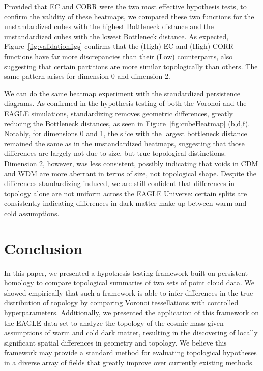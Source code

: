 \documentclass[12pt]{article}
\newcommand{\figref}[1]{Figure~\ref{#1}}
\begin{document}
Provided that EC and CORR were the two most effective hypothesis tests, to confirm the validity of these heatmaps, we compared these two functions for the unstandardized cubes with the highest Bottleneck distance and the unstandardized cubes with the lowest Bottleneck distance. As expected, \figref{fig:validationfigs} confirms that the (High) EC and (High) CORR functions have far more discrepancies than their (Low) counterparts, also suggesting that certain partitions are more similar topologically than others. The same pattern arises for dimension 0 and dimension 2.

We can do the same heatmap experiment with the standardized persistence diagrams. As confirmed in the hypothesis testing of both the Voronoi and the EAGLE simulations, standardizing removes geometric differences, greatly reducing the Bottleneck distances, as seen in \figref{fig:cubeHeatmap} (b,d,f). Notably, for dimensions 0 and 1, the slice with the largest bottleneck distance remained the same as in the unstandardized heatmaps, suggesting that those differences are largely not due to size, but true topological distinctions. Dimension 2, however, was less consistent, possibly indicating that voids in CDM and WDM are more aberrant in terms of size, not topological shape. Despite the differences standardizing induced, we are still confident that differences in topology alone are not uniform across the EAGLE Universe: certain splits are consistently indicating differences in dark matter make-up between warm and cold assumptions.


\section{Conclusion}
\label{sec:conc}
In this paper, we presented a hypothesis testing framework built on persistent homology to compare topological summaries of two sets of point cloud data. We showed empirically that such a framework is able to infer differences in the true distribution of topology by comparing Voronoi tessellations with controlled hyperparameters. Additionally, we presented the application of this framework on the EAGLE data set to analyze the topology of the cosmic mass given assumptions of warm and cold dark matter, resulting in the discovering of locally significant spatial differences in geometry and topology. We believe this framework may provide a standard method for evaluating topological hypotheses in a diverse array of fields that greatly improve over currently existing methods.
\end{document}
